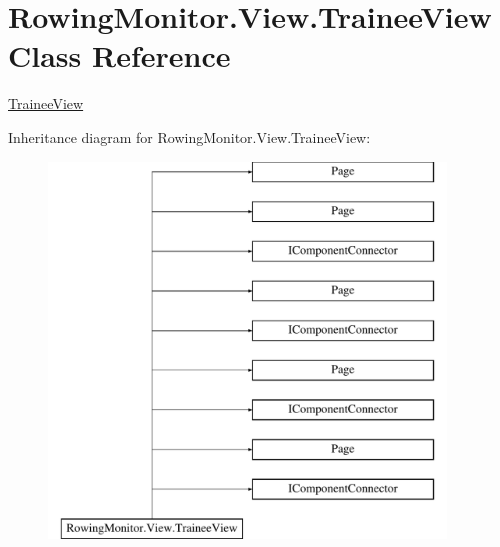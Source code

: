 \hypertarget{class_rowing_monitor_1_1_view_1_1_trainee_view}{}\section{Rowing\+Monitor.\+View.\+Trainee\+View Class Reference}
\label{class_rowing_monitor_1_1_view_1_1_trainee_view}


\hyperlink{class_rowing_monitor_1_1_view_1_1_trainee_view}{Trainee\+View}  


Inheritance diagram for Rowing\+Monitor.\+View.\+Trainee\+View\+:\begin{figure}[H]
\begin{center}
\leavevmode
\includegraphics[height=10.000000cm]{class_rowing_monitor_1_1_view_1_1_trainee_view}
\end{center}
\end{figure}
